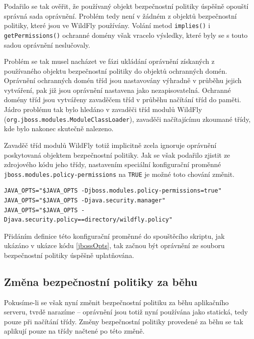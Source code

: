 Podařilo se tak ověřit, že používaný objekt bezpečnostní politiky úspěšně opouští správná sada oprávnění. Problém tedy není v žádném
z objektů bezpečnostní politiky, které jsou ve WildFly používány. Volání metod {\tt implies()} i {\tt getPermissions()} ochranné domény však vracelo výsledky,
které byly se s touto sadou oprávnění neslučovaly.

Problém se tak musel nacházet ve fázi ukládání oprávnění získaných z používaného objektu bezpečnostní politiky do objektů ochranných domén.
Oprávnění ochranných domén tříd jsou nastavovány výhradně v průběhu jejich vytváření, pak již jsou oprávnění nastavena jako nezapisovatelná.
Ochranné domény tříd jsou vytvářeny zavaděčem tříd v průběhu načítání tříd do paměti.
Jádro problému tak bylo hledáno v zavaděči tříd modulů WildFly ({\tt org.jboss.modules.ModuleClassLoader}), zavaděči načítajícímu zkoumané třídy, kde bylo nakonec skutečně nalezeno.

Zavaděč tříd modulů WildFly totiž implicitně zcela ignoruje oprávnění poskytovaná objektem bezpečnostní politiky.
Jak se však podařilo zjistit ze zdrojového kódu jeho třídy, nastavením speciální konfigurační proměnné {\tt jboss.modules.policy-permissions} na {\tt TRUE} je možné toto chování změnit. \cite{sourceModuleClassLoader}

\begin{lstlisting}[caption=Úprava spouštěcího skriptu pro spuštění se souborem bezpečnostní politiky, label=jbossOpts]
JAVA_OPTS="$JAVA_OPTS -Djboss.modules.policy-permissions=true"
JAVA_OPTS="$JAVA_OPTS -Djava.security.manager"
JAVA_OPTS="$JAVA_OPTS -Djava.security.policy==directory/wildfly.policy"
\end{lstlisting}

Přidáním definice této konfigurační proměnné do spouštěcího skriptu, jak ukázáno v ukázce kódu \ref{jbossOpts}, tak začnou být oprávnění ze souboru bezpečnostní politiky úspěšně uplatňována.

\subsection{Změna bezpečnostní politiky za běhu} \label{zmenaZaBehu}

Pokusíme-li se však nyní změnit bezpečnostní politiku za běhu aplikačního serveru, tvrdě narazíme -- oprávnění jsou totiž nyní používána jako statická,
tedy pouze při načítání třídy. Změny bezpečnostní politiky provedené za běhu se tak aplikují pouze na třídy načtené po této změně.

